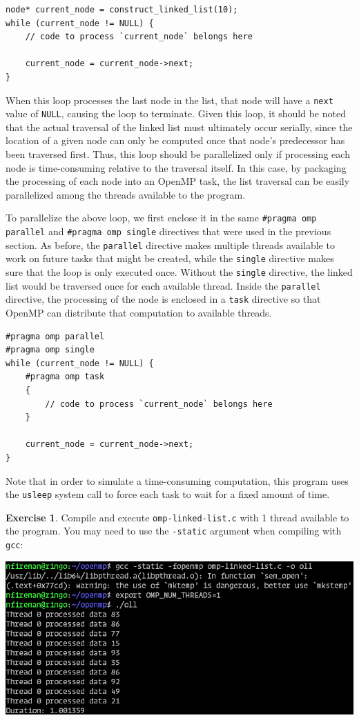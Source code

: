 \documentclass{article}
\theoremstyle{definition}
\newtheorem{exercise}{Exercise}
\begin{document}
\begin{verbatim}
node* current_node = construct_linked_list(10);
while (current_node != NULL) {
    // code to process `current_node` belongs here
    
    current_node = current_node->next;
}
\end{verbatim}

When this loop processes the last node in the list, that node will have a \texttt{next} value of \texttt{NULL}, causing the loop to terminate. Given this loop, it should be noted that the actual traversal of the linked list must ultimately occur serially, since the location of a given node can only be computed once that node's predecessor has been traversed first. Thus, this loop should be parallelized only if processing each node is time-consuming relative to the traversal itself. In this case, by packaging the processing of each node into an OpenMP task, the list traversal can be easily parallelized among the threads available to the program.

To parallelize the above loop, we first enclose it in the same \texttt{\#pragma omp parallel} and \texttt{\#pragma omp single} directives that were used in the previous section. As before, the \texttt{parallel} directive makes multiple threads available to work on future tasks that might be created, while the \texttt{single} directive makes sure that the loop is only executed once. Without the \texttt{single} directive, the linked list would be traversed once for each available thread. Inside the \texttt{parallel} directive, the processing of the node is enclosed in a \texttt{task} directive so that OpenMP can distribute that computation to available threads.

\begin{verbatim}
#pragma omp parallel
#pragma omp single
while (current_node != NULL) {
    #pragma omp task
    {
        // code to process `current_node` belongs here
    }
    
    current_node = current_node->next;
}  
\end{verbatim}

Note that in order to simulate a time-consuming computation, this program uses the \texttt{usleep} system call to force each task to wait for a fixed amount of time.

\begin{exercise}
Compile and execute \texttt{omp-linked-list.c} with 1 thread available to the program. You may need to use the \texttt{-static} argument when compiling with \texttt{gcc}:

\includegraphics[width=\textwidth]{images/linked-list-output.png}
\end{exercise}
\end{document}
